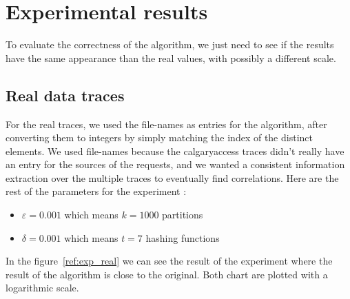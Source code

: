 \documentclass[a4paper]{article}%
\begin{document}
\section{Experimental results}

To evaluate the correctness of the algorithm, we just need to see if the results have the same appearance than the real values, with possibly a different scale.

\subsection{Real data traces}


For the real traces, we used the file-names as entries for the algorithm, after converting them to integers by simply matching the index of the distinct elements. We used file-names because the calgaryaccess traces didn't really have an entry for the sources of the requests, and we wanted a consistent information extraction over the multiple traces to eventually find correlations. Here are the rest of the parameters for the experiment :


\begin{itemize}
	\item $\varepsilon = 0.001$ which means $k = 1000$ partitions
	\item $\delta = 0.001$ which means $t = 7$ hashing functions
\end{itemize}

In the figure~\ref{ref:exp_real} we can see the result of the experiment where the result of the algorithm is close to the original. Both chart are plotted with a logarithmic scale.
\end{document}
